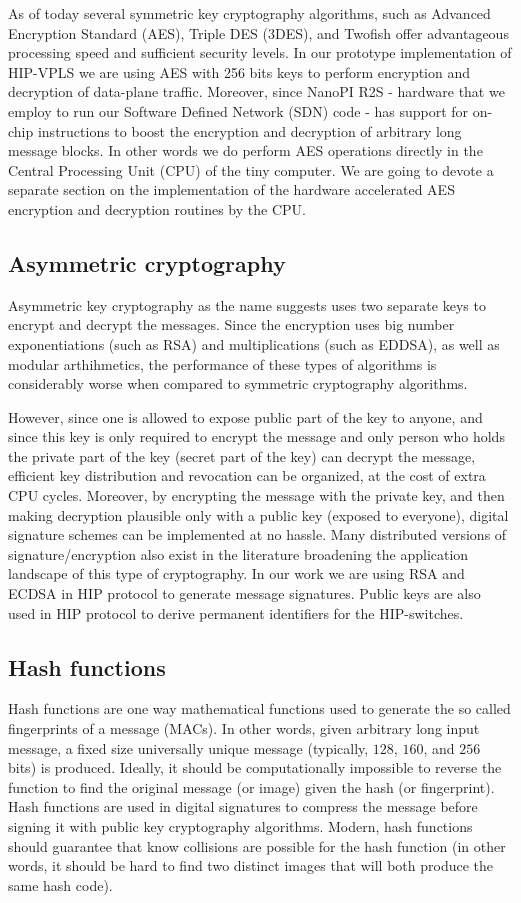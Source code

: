 As of today several symmetric key cryptography algorithms, such as
Advanced Encryption Standard (AES), Triple DES (3DES), and Twofish
offer advantageous processing speed and sufficient security levels.
In our prototype implementation of HIP-VPLS we are using AES with 256 
bits keys to perform encryption and decryption of data-plane traffic. Moreover,
since NanoPI R2S - hardware that we employ to run our Software Defined Network
(SDN) code - has support for on-chip instructions to boost the 
encryption and decryption of arbitrary long message blocks. In other words
we do perform AES operations directly in the Central Processing Unit (CPU) 
of the tiny computer. We are going to devote a separate section on the 
implementation of the hardware accelerated AES encryption and decryption 
routines by the CPU.

\subsection{Asymmetric cryptography}
Asymmetric key cryptography as the name suggests uses two separate keys
to encrypt and decrypt the messages. Since the encryption uses big number 
exponentiations (such as RSA) and multiplications (such as EDDSA), as well as
modular arthihmetics, the performance of these types of algorithms is 
considerably worse when compared to symmetric cryptography algorithms. 

However, since one is allowed to expose public part of the key to anyone,
and since this key is only required to encrypt the message and only person
who holds the private part of the key (secret part of the key) can decrypt the 
message, efficient key distribution and revocation can be organized, at the cost
of extra CPU cycles. Moreover, by encrypting the message with the private key,
and then making decryption plausible only with a public key (exposed to everyone),
digital signature schemes can be implemented at no hassle. Many distributed 
versions of signature/encryption also exist in the literature broadening the 
application landscape of this type of cryptography. In our work we are using
RSA and ECDSA in HIP protocol to generate message signatures. Public keys are 
also used in HIP protocol to derive permanent identifiers for the HIP-switches.

\subsection{Hash functions}
Hash functions are one way mathematical functions used to generate the so called
fingerprints of a message (MACs). In other words, given arbitrary long input message, a 
fixed size universally unique message (typically, $128$, $160$, and $256$ bits) is 
produced. Ideally, it should be computationally impossible to reverse the function
to find the original message (or image) given the hash (or fingerprint). Hash functions
are used in digital signatures to compress the message before signing it with 
public key cryptography algorithms. Modern, hash functions should guarantee 
that know collisions are possible for the hash function (in other words, it should 
be hard to find two distinct images that will both produce the same hash code).

